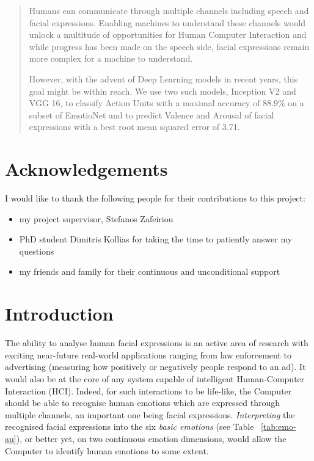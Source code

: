 \documentclass[12pt,twoside]{article}
\newcommand{\ackname}{Acknowledgements}
\begin{document}


\cleardoublepage
\begin{abstract}
  Humans can communicate through multiple channels including speech and facial
  expressions. Enabling machines to understand these channels would unlock a
  multitude of opportunities for Human Computer Interaction and while progress
  has been made on the speech side, facial expressions remain more complex for a
  machine to understand.

  However, with the advent of Deep Learning models in recent years, this goal might be within
  reach. We use two such models, Inception V2 and VGG 16, to classify Action Units with a maximal
  accuracy of 88.9\% on a subset of EmotioNet and to predict Valence and
  Arousal of facial expressions with a best root mean squared error of 3.71.
\end{abstract}
\cleardoublepage

\thispagestyle{empty}
\section*{\ackname}

I would like to thank the following people for their contributions to this
project:

\begin{itemize}
  \item my project supervisor, Stefanos Zafeiriou
  \item PhD student Dimitris Kollias for taking the time to patiently answer my
    questions
  \item my friends and family for their continuous and unconditional support
\end{itemize}

\cleardoublepage
\tableofcontents
\clearpage



\section{Introduction}

The ability to analyse human facial expressions is an active area of research
with exciting near-future real-world applications ranging from law enforcement
to advertising (measuring how positively or negatively people respond to an
ad). It would also be at the core of any system capable of intelligent
Human-Computer Interaction (HCI). Indeed, for such interactions to be
life-like, the Computer should be able to recognise human emotions which are
expressed through multiple channels, an important one being facial expressions.
\textit{Interpreting} the recognised facial expressions into the six
\textit{basic emotions} \cite{RefWorks:12} (see Table ~\ref{tab:emo-au}), 
or better yet, on two continuous emotion dimensions,
would allow the Computer to identify human emotions to some extent.
\end{document}
